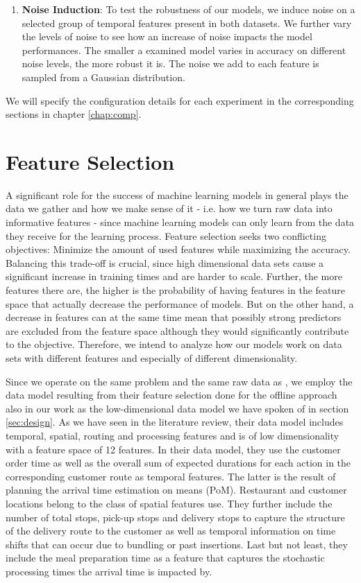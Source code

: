 \begin{enumerate}
	\item \textbf{Noise Induction}: To test the robustness of our models, we induce noise on a selected group of temporal features present in both datasets. We further vary the levels of noise to see how an increase of noise impacts the model performances. The smaller a examined model varies in accuracy on different noise levels, the more robust it is. The noise we add to each feature is sampled from a Gaussian distribution. 
\end{enumerate}
We will specify the configuration details for each experiment in the corresponding sections in chapter \ref{chap:comp}. 

\section{Feature Selection}\label{sec:fs}

A significant role for the success of machine learning models in general plays the data we gather and how we make sense of it - i.e. how we turn raw data into informative features - since machine learning models can only learn from the data they receive for the learning process. Feature selection seeks two conflicting objectives: Minimize the amount of used features while maximizing the accuracy. Balancing this trade-off is crucial, since high dimensional data sets cause a significant increase in training times and are harder to scale. Further, the more features there are, the higher is the probability of having features in the feature space that actually decrease the performance of models. But on the other hand, a decrease in features can at the same time mean that possibly strong predictors are excluded from the feature space although they would significantly contribute to the objective. Therefore, we intend to analyze how our models work on data sets with different features and especially of different dimensionality. 

Since we operate on the same problem and the same raw data as \cite{Hildebrandt2020_EAT}, we employ the data model resulting from their feature selection done for the offline approach also in our work as the low-dimensional data model we have spoken of in section \ref{sec:design}. As we have seen in the literature review, their data model includes temporal, spatial, routing and processing features and is of low dimensionality with a feature space of 12 features.
In their data model, they use the customer order time as well as the overall sum of expected durations for each action in the corresponding customer route as temporal features. The latter is the result of planning the arrival time estimation on means (PoM). Restaurant and customer locations belong to the class of spatial features \cite{Hildebrandt2020_EAT} use. They further include the number of total stops, pick-up stops and delivery stops to capture the structure of the delivery route to the customer as well as temporal information on time shifts that can occur due to bundling or past insertions. Last but not least, they include the meal preparation time as a feature that captures the stochastic processing times the arrival time is impacted by.

